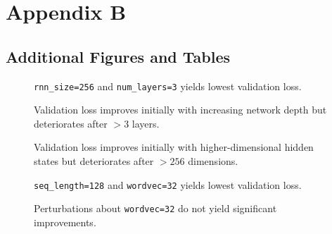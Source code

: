 \chapter{Appendix B}

\ifpdf
    \graphicspath{{Appendix2/Figs/Raster/}{Appendix2/Figs/PDF/}{Appendix2/Figs/}}
\else
    \graphicspath{{Appendix2/Figs/Vector/}{Appendix2/Figs/}}
\fi

\section{Additional Figures and Tables}

\begin{center}
  \label{tab:torch-rnn-config-perfs}
  
  \addtocounter{table}{-1}%
\end{center}

\begin{figure}[tb]
    \centering
    
    \caption{\texttt{rnn\_size=256} and \texttt{num\_layers=3} yields lowest validation loss.}
    \label{fig:torch-rnn-network-params}
\end{figure}

\begin{figure}[tb]
  \centering
  
  \caption{Validation loss improves initially with increasing network depth but deteriorates after $>3$ layers.}
  \label{fig:torch-rnn-network-params-num-layers}
\end{figure}

\begin{figure}[tb]
  \centering
  
  \caption{Validation loss improves initially with higher-dimensional hidden states
  but deteriorates after $>256$ dimensions.}
  \label{fig:torch-rnn-network-params-rnn-size}
\end{figure}

\begin{figure}[tb]
    \centering
    
    \caption{\texttt{seq\_length=128} and \texttt{wordvec=32} yields lowest validation loss.}
    \label{fig:torch-rnn-input-params}
\end{figure}

\begin{figure}[tb]
  \centering
  
  \caption{Perturbations about \texttt{wordvec=32} do not yield significant improvements.}
  \label{fig:torch-rnn-input-params-wordvec}
\end{figure}

